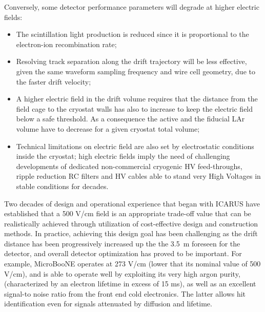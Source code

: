 Conversely, some detector performance parameters will degrade at higher electric fields:  
\begin{itemize}
\item The scintillation light production is reduced since it is proportional to the electron-ion recombination rate; 
\item Resolving track separation along the drift trajectory will be less effective, given the same waveform sampling frequency and wire cell geometry,  due to  the faster  drift velocity;
\item A higher electric field in the drift volume requires that the distance from the field cage to the cryostat walls has also to increase to keep the electric field below a safe threshold.
As a consequence the active and the fiducial LAr volume have to decrease for a given cryostat total volume;


\item Technical limitations on electric field  are also set by electrostatic conditions inside the cryostat; high electric fields imply the need of challenging developments of dedicated non-commercial cryogenic HV feed-throughs, ripple reduction RC filters and HV cables able to  stand very High Voltages in stable conditions for decades.

\end{itemize}


Two decades of design and operational experience that began with ICARUS have established that a 500 V/cm field is an appropriate trade-off value that can be realistically achieved through utilization of cost-effective design and construction methods. In practice, achieving this design goal has been challenging as the drift distance has been progressively increased up the the 
\SI{3.5}{m} foreseen for the  detector, and overall detector optimization has proved to be important. For example, MicroBooNE operates  at 273 V/cm (lower that its nominal value of 500 V/cm), and is able to operate well by exploiting its very high argon purity, (characterized by an electron lifetime in excess of 15 ms), as well as an excellent signal-to noise ratio from the front end cold electronics.  The latter allows hit identification even for signals attenuated by diffusion and lifetime. 


